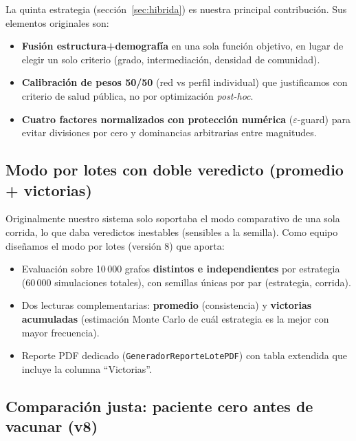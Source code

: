 \documentclass[spanish,notitlepage,letterpaper, 12pt]{article}
\begin{document}
La quinta estrategia (secci\'on~\ref{sec:hibrida}) es nuestra principal contribuci\'on. Sus elementos originales son:
\begin{itemize}[leftmargin=*]
    \item \textbf{Fusi\'on estructura+demograf\'ia} en una sola funci\'on objetivo, en lugar de elegir un solo criterio (grado, intermediaci\'on, densidad de comunidad).
    \item \textbf{Calibraci\'on de pesos 50/50} (red vs perfil individual) que justificamos con criterio de salud p\'ublica, no por optimizaci\'on \textit{post-hoc}.
    \item \textbf{Cuatro factores normalizados con protecci\'on num\'erica} ($\varepsilon$-guard) para evitar divisiones por cero y dominancias arbitrarias entre magnitudes.
\end{itemize}

\subsection{Modo por lotes con doble veredicto (promedio + victorias)}

Originalmente nuestro sistema solo soportaba el modo comparativo de una sola corrida, lo que daba veredictos inestables (sensibles a la semilla). Como equipo dise\~namos el modo por lotes (versi\'on 8) que aporta:
\begin{itemize}[leftmargin=*]
    \item Evaluaci\'on sobre 10\,000 grafos \textbf{distintos e independientes} por estrategia (60\,000 simulaciones totales), con semillas \'unicas por par (estrategia, corrida).
    \item Dos lecturas complementarias: \textbf{promedio} (consistencia) y \textbf{victorias acumuladas} (estimaci\'on Monte Carlo de cu\'al estrategia es la mejor con mayor frecuencia).
    \item Reporte PDF dedicado (\texttt{GeneradorReporteLotePDF}) con tabla extendida que incluye la columna ``Victorias''.
\end{itemize}

\subsection{Comparaci\'on justa: paciente cero antes de vacunar (v8)}
\end{document}

